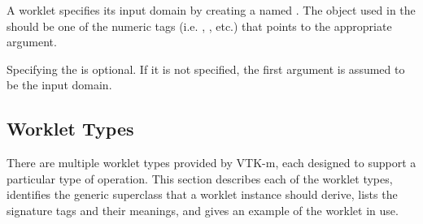 A worklet specifies its input domain by creating a  named
. The object used in the  should be
one of the numeric tags (i.e. , , etc.) that
points to the appropriate \controlsignature argument.

Specifying the  is optional. If it is not specified,
the first argument is assumed to be the input domain.


\subsection{Worklet Types}
\label{sec:WorkletTypes}


There are multiple worklet types provided by VTK-m, each designed to
support a particular type of operation. This section describes each of the
worklet types, identifies the generic superclass that a worklet instance
should derive, lists the signature tags and their meanings, and gives an
example of the worklet in use.

